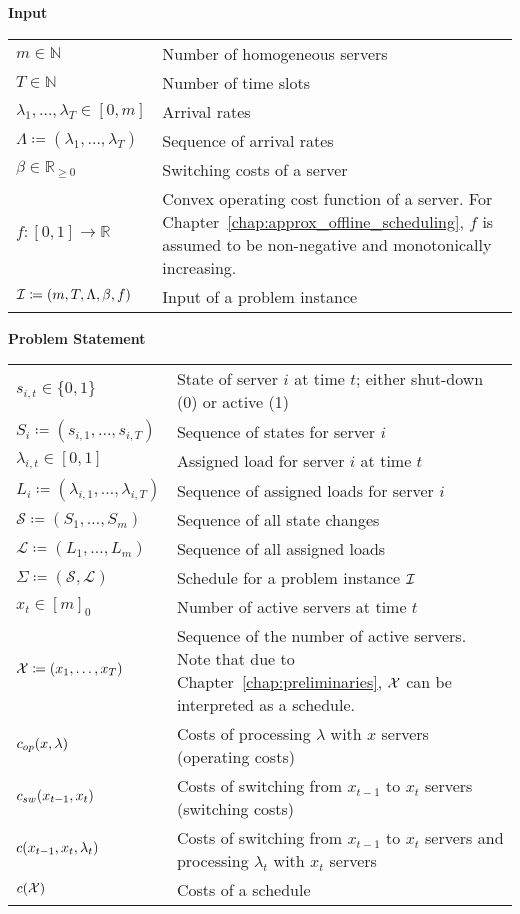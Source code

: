 
\large{\textbf{Input}}
\bgroup
\def\arraystretch{1.5}%
\begin{longtable}{p{} p{}}
  $m\in\mathbb{N}$ & Number of homogeneous servers \\
  $T\in\mathbb{N}$& Number of time slots\\
  $\lambda_1,\dotsc,\lambda_{T}\in[0,m]$& Arrival rates\\
  $\Lambda\coloneqq(\lambda_1,\dotsc,\lambda_T)$& Sequence of arrival rates\\
  $\beta\in\mathbb{R}_{\ge 0}$& Switching costs of a server\\
  $f:[0,1]\rightarrow\mathbb{R}$& Convex operating cost function of a server. For Chapter~\ref{chap:approx_offline_scheduling}, $f$ is assumed to be non-negative and monotonically increasing.\\
  $\mathcal{I}\coloneqq(m,T,\Lambda,\beta,f)$& Input of a problem instance
\end{longtable}
\large{\textbf{Problem Statement}}
\begin{longtable}{p{} p{}}
  $s_{i,t}\in\{0,1\}$& State of server $i$ at time $t$; either shut-down (0) or active (1)\\
  $S_i\coloneqq(s_{i,1},\dotsc,s_{i,T})$& Sequence of states for server $i$\\
  $\lambda_{i,t}\in[0,1]$& Assigned load for server $i$ at time $t$\\
  $L_i\coloneqq(\lambda_{i,1},\dotsc,\lambda_{i,T})$& Sequence of assigned loads for server $i$\\
  $\mathcal{S}\coloneqq(S_1,\dotsc,S_m)$& Sequence of all state changes\\
  $\mathcal{L}\coloneqq(L_1,\dotsc,L_m)$& Sequence of all assigned loads\\
  $\Sigma\coloneqq(\mathcal{S},\mathcal{L})$& Schedule for a problem instance $\mathcal{I}$\\
  $x_t\in[m]_0$& Number of active servers at time $t$\\
  $\mathcal{X}\coloneqq(x_1,\ldots,x_T)$& Sequence of the number of active servers. Note that due to Chapter~\ref{chap:preliminaries}, $\mathcal{X}$ can be interpreted as a schedule.\\
  $c_{op}(x,\lambda)$& Costs of processing $\lambda$ with $x$ servers (operating costs)\\
  $c_{sw}(x_{t-1},x_{t})$& Costs of switching from $x_{t-1}$ to $x_t$ servers (switching costs)\\
  $c(x_{t-1},x_{t},\lambda_t)$& Costs of switching from $x_{t-1}$ to $x_t$ servers and processing $\lambda_t$ with $x_t$ servers\\
  $c(\mathcal{X})$& Costs of a schedule
\end{longtable}
